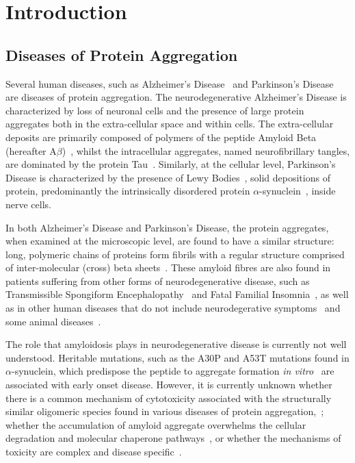\section{Introduction}
\subsection{Diseases of Protein Aggregation}
Several human diseases, such as Alzheimer's Disease~\cite{ueda1993} and Parkinson's Disease~\cite{spillantini1997} are diseases of protein aggregation. The neurodegenerative Alzheimer's Disease is characterized by loss of neuronal cells and the presence of large protein aggregates both in the extra-cellular space and within cells. The extra-cellular deposits are primarily composed of polymers of the peptide Amyloid Beta (hereafter A${\beta}$)~\cite{Noe2004}, whilst the intracellular aggregates, named neurofibrillary tangles, are dominated by the protein Tau~\cite{goedert1989}. Similarly, at the cellular level, Parkinson's Disease is characterized by the presence of Lewy Bodies~\cite{Gibb1988}, solid depositions of protein, predominantly the intrinsically disordered protein $\alpha$-synuclein~\cite{spillantini1997}, inside nerve cells.


In both Alzheimer's Disease and Parkinson's Disease, the protein aggregates, when examined at the microscopic level, are found to have a similar structure: long, polymeric chains of proteins form fibrils with a regular structure comprised of inter-molecular (cross) beta sheets~\cite{Serpell2000}. These amyloid fibres are also found in patients suffering from other forms of neurodegenerative disease, such as Transmissible Spongiform Encephalopathy~\cite{Wells1987} and Fatal Familial Insomnia~\cite{Goldfarb1992}, as well as in other human diseases that do not include neurodegerative symptoms~\cite{Clark1988} and some animal diseases~\cite{Safar1993}. 


The role that amyloidosis plays in neurodegenerative disease is currently not well understood. Heritable mutations, such as the A30P and A53T mutations found in $\alpha$-synuclein, which predispose the peptide to aggregate formation \emph{in vitro}~\cite{Conway1999} are associated with early onset disease. However, it is currently unknown whether there is a common mechanism of cytotoxicity associated with the structurally similar oligomeric species found in various diseases of protein aggregation,~\cite{Haas2007}; whether the accumulation of amyloid aggregate overwhelms the cellular degradation and molecular chaperone pathways~\cite{Muchowski2005}, or whether the mechanisms of toxicity are complex and disease specific~\cite{Benilova2012}.      

